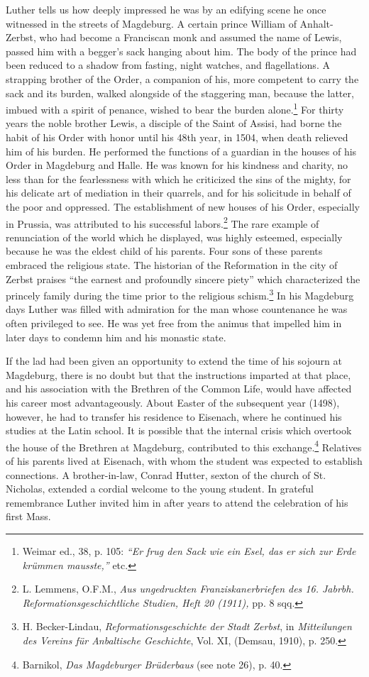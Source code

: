 Luther tells us how deeply impressed he was by an edifying scene
he once witnessed in the streets of Magdeburg. A certain prince
William of Anhalt-Zerbst, who had become a Franciscan monk and
assumed the name of Lewis, passed him with a begger’s sack hanging
about him. The body of the prince had been reduced to a shadow
from fasting, night watches, and flagellations. A strapping brother
of the Order, a companion of his, more competent to carry the sack
and its burden, walked alongside of the staggering man, because the
latter, imbued with a spirit of penance, wished to bear the burden
alone.\footnote{Weimar ed., 38, p. 105: \textit{“Er frug den Sack wie ein Esel, das er sich zur Erde krümmen mausste,”} etc.}
For thirty years the noble brother Lewis, a disciple of the
Saint of Assisi, had borne the habit of his Order with honor until his
48th year, in 1504, when death relieved him of his burden. He performed
the functions of a guardian in the houses of his Order in
Magdeburg and Halle. He was known for his kindness and charity,
no less than for the fearlessness with which he criticized the sins of
the mighty, for his delicate art of mediation in their quarrels, and for
his solicitude in behalf of the poor and oppressed. The establishment
of new houses of his Order, especially in Prussia, was attributed to
his successful labors.\footnote{L. Lemmens, O.F.M., \textit{Aus ungedruckten Franziskanerbriefen des 16. Jabrbh. Reformationsgeschichtliche Studien, Heft 20 (1911),} pp. 8 sqq.}
The rare example of renunciation of the world
which he displayed, was highly esteemed, especially because he was the
eldest child of his parents. Four sons of these parents embraced the religious state.
The historian of the Reformation in the city of Zerbst
praises “the earnest and profoundly sincere piety” which characterized the princely family during the time prior to the religious schism.\footnote{H. Becker-Lindau, \textit{Reformationsgeschichte der Stadt Zerbst}, in \textit{Mitteilungen des Vereins für Anbaltische Geschichte}, Vol. XI, (Demsau, 1910), p. 250.}
In his Magdeburg days Luther was filled with admiration for the man
whose countenance he was often privileged to see. He was yet free
from the animus that impelled him in later days to condemn him and
his monastic state.

If the lad had been given an opportunity to extend the time of his
sojourn at Magdeburg, there is no doubt but that the instructions
imparted at that place, and his association with the Brethren of the
Common Life, would have affected his career most advantageously.
About Easter of the subsequent year (1498), however, he had to
transfer his residence to Eisenach, where he continued his studies at
the Latin school. It is possible that the internal crisis which overtook
the house of the Brethren at Magdeburg, contributed to this exchange.\footnote{Barnikol, \textit{Das Magdeburger Brüderbaus} (see note 26), p. 40.}
Relatives of his parents lived at Eisenach, with whom the
student was expected to establish connections.
A brother-in-law, Conrad Hutter, sexton of the church of St. Nicholas, extended a cordial
welcome to the young student. In grateful remembrance Luther invited him in after years to attend the celebration of his first Mass.

